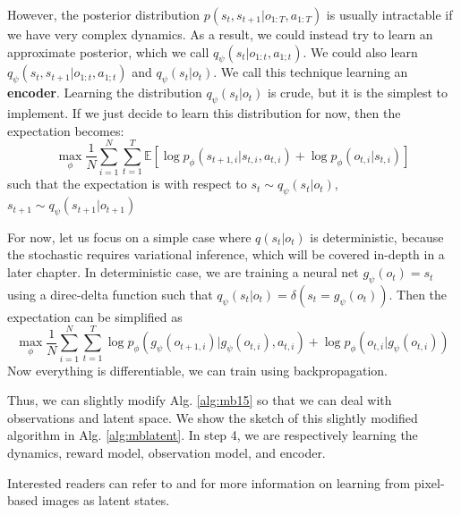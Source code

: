 However, the posterior distribution $p(s_t,s_{t+1}|o_{1:T},a_{1:T})$ is usually intractable if we have very complex dynamics. As a result, we could instead try to learn an approximate posterior, which we call $q_\psi(s_t|o_{1:t},a_{1;t})$. We could also learn $q_\psi(s_t,s_{t+1}|o_{1:t},a_{1;t})$ and $q_\psi(s_t|o_t)$. We call this technique learning an \textbf{encoder}. Learning the distribution $q_\psi(s_t|o_t)$ is crude, but it is the simplest to implement. If we just decide to learn this distribution for now, then the expectation becomes:
\[
\max_\phi \frac{1}{N}\sum_{i=1}^N\sum_{t=1}^T\mathbb{E}\left[\log p_\phi(s_{t+1,i}|s_{t,i},a_{t,i}) + \log p_\phi(o_{t,i}|s_{t,i})\right]
\]
such that the expectation is with respect to $s_t\sim q_\psi(s_t|o_t)$, $s_{t+1}\sim q_\psi(s_{t+1}|o_{t+1})$

For now, let us focus on a simple case where $q(s_t|o_t)$ is deterministic, because the stochastic requires variational inference, which will be covered in-depth in a later chapter. In deterministic case, we are training a neural net $g_\psi(o_t) = s_t$ using a direc-delta function such that $q_\psi(s_t|o_t) = \delta(s_t = g_\psi(o_t))$. Then the expectation can be simplified as
\[
\max_\phi \frac{1}{N}\sum_{i=1}^N\sum_{t=1}^T\log p_\phi(g_\psi(o_{t+1,i})|g_\psi(o_{t,i}),a_{t,i}) + \log p_\phi(o_{t,i}|g_\psi(o_{t,i}))
\]
Now everything is differentiable, we can train using backpropagation. 

Thus, we can slightly modify Alg. \ref{alg:mb15} so that we can deal with observations and latent space. We show the sketch of this slightly modified algorithm in Alg. \ref{alg:mblatent}. In step 4, we are respectively learning the dynamics, reward model, observation model, and encoder.


Interested readers can refer to \cite{watter2015embed} and \cite{zhang2018solar} for more information on learning from pixel-based images as latent states.